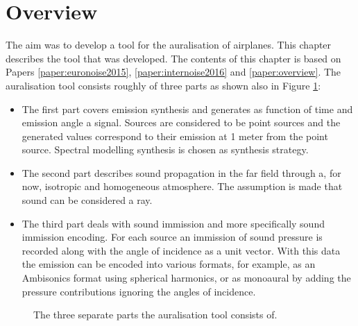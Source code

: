 \section{Overview}

The aim was to develop a tool for the auralisation of airplanes.
This chapter describes the tool that was developed. The contents of this chapter
is based on Papers \ref{paper:euronoise2015}, \ref{paper:internoise2016} and \ref{paper:overview}.
The auralisation tool consists roughly of three parts as shown also in Figure
\ref{fig:implementation:overview}:

\begin{itemize}
\item The first part covers emission synthesis and generates as function of time and
emission angle a signal. Sources are considered to be point sources and the
generated values correspond to their emission at 1 meter from the point source.
Spectral modelling synthesis is chosen as synthesis strategy.

\item The second part describes sound propagation in the far field through a,
for now, isotropic and homogeneous atmosphere. The assumption is made that sound
can be considered a ray.

\item The third part deals with sound immission and more specifically sound immission
encoding. For each source an immission of sound pressure is recorded along with
the angle of incidence as a unit vector. With this data the emission can be
encoded into various formats, for example, as an Ambisonics format using
spherical harmonics, or as monoaural by adding the pressure contributions
ignoring the angles of incidence.
\end{itemize}

\begin{figure}[H]
  \centering
{}
  \caption{The three separate parts the auralisation tool consists of.}
  \label{fig:implementation:overview}
\end{figure}

